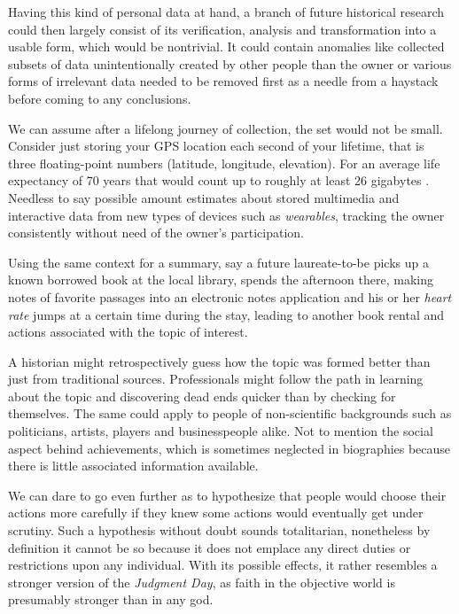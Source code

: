 \documentclass[a4paper]{article}
\begin{document}
Having this kind of personal data at hand, a branch of future historical research could then largely consist of its verification, analysis and transformation into a usable form, which would be nontrivial.
It could contain anomalies like collected subsets of data unintentionally created by other people than the owner or various forms of irrelevant data needed to be removed first as a needle from a haystack before coming to any conclusions.

We can assume after a lifelong journey of collection, the set would not be small. Consider just storing your GPS location each second of your  lifetime, that is three floating-point numbers (latitude, longitude, elevation). 
For an average life expectancy of 70 years that would count up to roughly at least 26 gigabytes \cite{calc}. Needless to say possible amount estimates about stored multimedia and interactive data from new types of devices such as \emph{wearables}, tracking the owner consistently without need of the owner's participation.

Using the same context for a summary, say a future laureate-to-be picks up a known borrowed book at the local library, spends the afternoon there, making notes of favorite passages into an electronic notes application and his or her \emph{heart rate} jumps at a certain time during the stay, leading to another book rental and actions associated with the topic of interest. 

A historian might retrospectively guess how the topic was formed better than just from traditional sources. Professionals might follow the path in learning about the topic and discovering dead ends quicker than by checking for themselves. 
The same could apply to people of non-scientific backgrounds such as politicians, artists, players and businesspeople alike. Not to mention the social aspect behind achievements, which is sometimes neglected in biographies because there is little associated information available.

We can dare to go even further as to hypothesize that people would choose their actions more carefully if they knew some actions would eventually get under scrutiny. Such a hypothesis without doubt sounds totalitarian, nonetheless by definition it cannot be so because it does not emplace any direct duties or restrictions upon any individual. With its possible effects, it rather resembles a stronger version of the \textit{Judgment Day}, as faith in the objective world is presumably stronger than in any god. 
\end{document}
